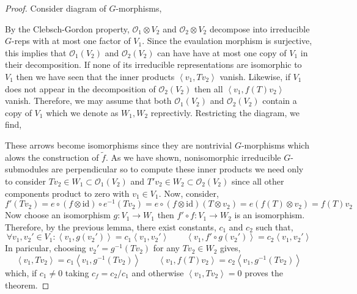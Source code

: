 \documentclass[12pt]{extarticle}
\newcommand{\id}{\mathrm{id}}
\theoremstyle{definition}
\newcommand{\inner}[2]{\left< #1, #2 \right>}
\begin{document}
\begin{proof}
Consider diagram of $G$-morphisms,
\begin{center}
\end{center}
By the Clebsch-Gordon property, $\mathcal{O}_1 \otimes V_2$ and $\mathcal{O}_2 \otimes V_2$ decompose into irreducible $G$-reps with at most one factor of $V_1$. Since the evaulation morphism is surjective, this implies that $\mathcal{O}_1(V_2)$ and $\mathcal{O}_2(V_2)$ can have have at most one copy of $V_1$ in their decomposition. If none of its irreducible representations are isomorphic to $V_1$ then we have seen that the inner products $\inner{v_1}{T v_2}$ vanish. Likewise, if $V_1$ does not appear in the decomposition of $\mathcal{O}_2(V_2)$ then all $\inner{v_1}{f(T) v_2}$ vanish. Therefore, we may assume that both $\mathcal{O}_1(V_2)$ and $\mathcal{O}_2(V_2)$ contain a copy of $V_1$ which we denote as $W_1, W_2$ reprectivly. Restricting the diagram, we find,
\begin{center}
\end{center}
These arrows become isomorphisms since they are nontrivial $G$-morphisms which alows the construction of $\tilde{f}$. As we have shown, nonisomorphic irreducible $G$-submodules are perpendicular so to compute these inner products we need only to consider $T v_2 \in W_1 \subset \mathcal{O}_1(V_2)$ and $T' v_2 \in W_2 \subset \mathcal{O}_2(V_2)$ since all other components product to zero with $v_1 \in V_1$. Now, consider,
\[ f'(T v_2) = e \circ (f \otimes \id) \circ e^{-1}(T v_2) = e \circ (f \otimes \id)(T \otimes v_2) = e(f(T) \otimes v_2) = f(T) v_2 \]
Now choose an isomorphism $g : V_1 \to W_1$ then $f' \circ f : V_1 \to W_2$ is an isomorphism. Therefore, by the previous lemma, there exist constants, $c_1$ and $c_2$ such that,
\[ \forall v_1, v_2' \in V_1 : \inner{v_1}{g(v_2')} = c_1 \inner{v_1}{v_2'} \quad \quad \inner{v_1}{f' \circ g(v_2')} = c_2 \inner{v_1}{v_2'} \]
In paricular, choosing $v_2' = g^{-1}(T v_2)$ for any $T v_2 \in W_2$ gives,
\[  \inner{v_1}{Tv_2} = c_1 \inner{v_1}{g^{-1}(T v_2)} \quad \quad \inner{v_1}{f(T) v_2} = c_2 \inner{v_1}{g^{-1}(T v_2)} \]
which, if $c_1 \neq 0$ taking $c_f = c_2 / c_1$ and otherwise $\inner{v_1}{T v_2} = 0$ proves the theorem. 
\end{proof}
\end{document}
